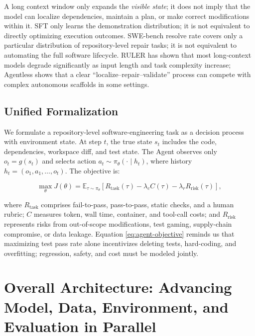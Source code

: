 \documentclass[10pt,a4paper,UTF8,fontset=none]{ctexart}
\begin{document}
\begin{keybox}
A long context window only expands the \emph{visible state}; it does not imply that the model can localize dependencies, maintain a plan, or make correct modifications within it. SFT only learns the demonstration distribution; it is not equivalent to directly optimizing execution outcomes. SWE-bench resolve rate covers only a particular distribution of repository-level repair tasks; it is not equivalent to automating the full software lifecycle. RULER has shown that most long-context models degrade significantly as input length and task complexity increase\cite{hsieh2024ruler}; Agentless shows that a clear ``localize--repair--validate'' process can compete with complex autonomous scaffolds in some settings\cite{xia2024agentless}.
\end{keybox}

\subsection{Unified Formalization}

We formulate a repository-level software-engineering task as a decision process with environment state. At step $t$, the true state $s_t$ includes the code, dependencies, workspace diff, and test state. The Agent observes only $o_t=g(s_t)$ and selects action $a_t\sim\pi_\theta(\cdot\mid h_t)$, where history $h_t=(o_1,a_1,\ldots,o_t)$. The objective is:

\begin{equation}
\max_\theta J(\theta)=\mathbb{E}_{\tau\sim\pi_\theta}\left[R_{\mathrm{task}}(\tau)-\lambda_c C(\tau)-\lambda_r R_{\mathrm{risk}}(\tau)\right],
\label{eq:agent-objective}
\end{equation}

where $R_{\mathrm{task}}$ comprises fail-to-pass, pass-to-pass, static checks, and a human rubric; $C$ measures token, wall time, container, and tool-call costs; and $R_{\mathrm{risk}}$ represents risks from out-of-scope modifications, test gaming, supply-chain compromise, or data leakage. Equation \eqref{eq:agent-objective} reminds us that maximizing test pass rate alone incentivizes deleting tests, hard-coding, and overfitting; regression, safety, and cost must be modeled jointly.

\section{Overall Architecture: Advancing Model, Data, Environment, and Evaluation in Parallel}
\end{document}
